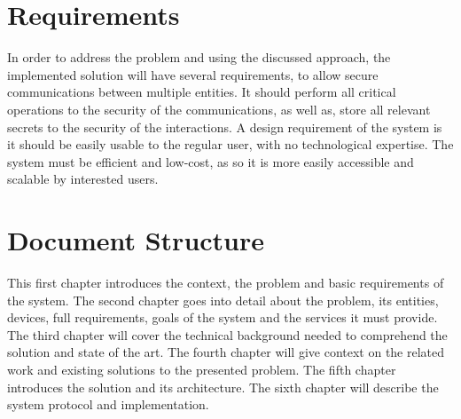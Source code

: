 \section{Requirements} \label{chap:intro:requirements}

In order to address the problem and using the discussed approach, the implemented solution will have several requirements, to allow secure communications between multiple entities.
It should perform all critical operations to the security of the communications, as well as, store all relevant secrets to the security of the interactions.
A design requirement of the system is it should be easily usable to the regular user, with no technological expertise. The system must be efficient and low-cost, as so it is more easily accessible and scalable by interested users.

\section{Document Structure} \label{chap:intro:doc}

This first chapter introduces the context, the problem and basic requirements of the system.
The second chapter goes into detail about the problem, its entities, devices, full requirements, goals of the system and the services it must provide.
The third chapter will cover the technical background needed to comprehend the solution and state of the art.
The fourth chapter will give context on the related work and existing solutions to the presented problem.
The fifth chapter introduces the solution and its architecture. The sixth chapter will describe the system protocol and implementation.
